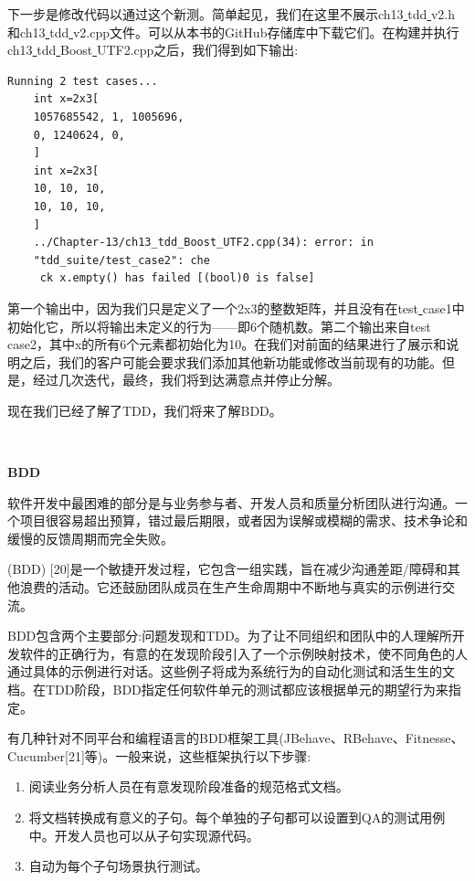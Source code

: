 下一步是修改代码以通过这个新测。简单起见，我们在这里不展示ch13\underline{ }tdd\underline{ }v2.h和ch13\underline{ }tdd\underline{ }v2.cpp文件。可以从本书的GitHub存储库中下载它们。在构建并执行ch13\underline{ }tdd\underline{ }Boost\underline{ }UTF2.cpp之后，我们得到如下输出: \par

\begin{lstlisting}[caption={}]
Running 2 test cases...
	int x=2x3[
	1057685542, 1, 1005696,
	0, 1240624, 0,
	]
	int x=2x3[
	10, 10, 10,
	10, 10, 10,
	]
	../Chapter-13/ch13_tdd_Boost_UTF2.cpp(34): error: in
	"tdd_suite/test_case2": che
	 ck x.empty() has failed [(bool)0 is false]
\end{lstlisting}

第一个输出中，因为我们只是定义了一个2x3的整数矩阵，并且没有在test\underline{ }case1中初始化它，所以将输出未定义的行为——即6个随机数。第二个输出来自test\underline{ }case2，其中x的所有6个元素都初始化为10。在我们对前面的结果进行了展示和说明之后，我们的客户可能会要求我们添加其他新功能或修改当前现有的功能。但是，经过几次迭代，最终，我们将到达满意点并停止分解。 \par
现在我们已经了解了TDD，我们将来了解BDD。 \par

\noindent\textbf{}\ \par
\textbf{BDD} \ \par
软件开发中最困难的部分是与业务参与者、开发人员和质量分析团队进行沟通。一个项目很容易超出预算，错过最后期限，或者因为误解或模糊的需求、技术争论和缓慢的反馈周期而完全失败。 \par
(BDD) [20]是一个敏捷开发过程，它包含一组实践，旨在减少沟通差距/障碍和其他浪费的活动。它还鼓励团队成员在生产生命周期中不断地与真实的示例进行交流。 \par
BDD包含两个主要部分:问题发现和TDD。为了让不同组织和团队中的人理解所开发软件的正确行为，有意的在发现阶段引入了一个示例映射技术，使不同角色的人通过具体的示例进行对话。这些例子将成为系统行为的自动化测试和活生生的文档。在TDD阶段，BDD指定任何软件单元的测试都应该根据单元的期望行为来指定。 \par
有几种针对不同平台和编程语言的BDD框架工具(JBehave、RBehave、Fitnesse、Cucumber[21]等)。一般来说，这些框架执行以下步骤: \par

\begin{enumerate}
	\item 阅读业务分析人员在有意发现阶段准备的规范格式文档。
	\item 将文档转换成有意义的子句。每个单独的子句都可以设置到QA的测试用例中。开发人员也可以从子句实现源代码。
	\item 自动为每个子句场景执行测试。
\end{enumerate}

